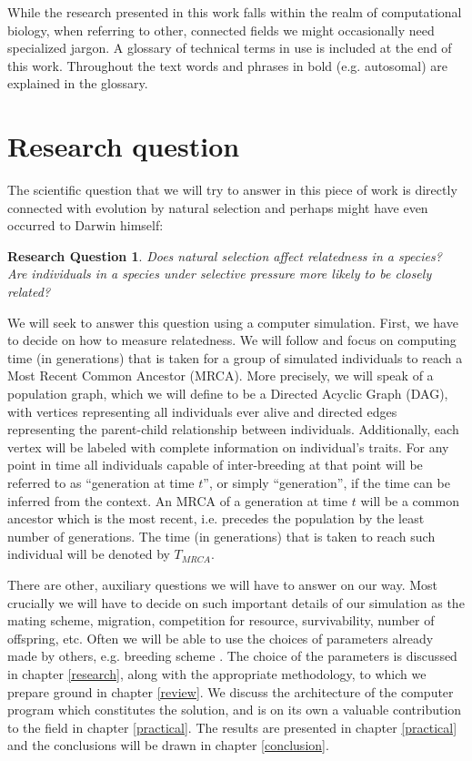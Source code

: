 \documentclass{l4proj}
\newtheorem*{quest}{Research Question}
\begin{document}
While the research presented in this work falls within the realm of computational biology, when referring to other, connected fields we might occasionally need specialized jargon. A glossary of technical terms in use is included at the end of this work. Throughout the text words and phrases in bold (e.g. \gls{autosomal}) are explained in the glossary.

\section{Research question}
The scientific question that we will try to answer in this piece of work is directly connected with evolution by natural selection and perhaps might have even occurred to Darwin himself:

\begin{quest}
Does natural selection affect relatedness in a species? Are individuals in a species under selective pressure more likely to be closely related?
\end{quest}

We will seek to answer this question using a computer simulation. First, we have to decide on how to measure relatedness. We will follow \cite{rohde04} and focus on computing time (in generations) that is taken for a group of simulated individuals to reach a Most Recent Common Ancestor (MRCA). More precisely, we will speak of a \gls{population graph}, which we will define to be a Directed Acyclic Graph (DAG), with vertices representing all individuals ever alive and directed edges representing the parent-child relationship between individuals. Additionally, each vertex will be labeled with complete information on individual's traits. For any point in time all individuals capable of inter-breeding at that point will be referred to as ``generation at time $t$'', or simply ``generation'', if the time can be inferred from the context. An MRCA of a generation at time $t$ will be a common ancestor which is the most recent, i.e. precedes the population by the least number of generations. The time (in generations) that is taken to reach such individual will be denoted by $T_{MRCA}$.

There are other, auxiliary questions we will have to answer on our way. Most crucially we will have to decide on such important details of our simulation as the mating scheme, migration, competition for resource, survivability, number of offspring, etc. Often we will be able to use the choices of parameters already made by others, e.g. breeding scheme \parencite{peng10}. The choice of the parameters is discussed in chapter \ref{research}, along with the appropriate methodology, to which we prepare ground in chapter \ref{review}. We discuss the architecture of the computer program which constitutes the solution, and is on its own a valuable contribution to the field in chapter \ref{practical}. The results are presented in chapter \ref{practical} and the conclusions will be drawn in chapter \ref{conclusion}.
\end{document}
